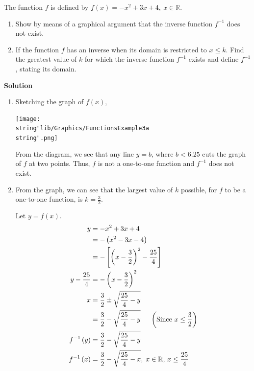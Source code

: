\documentclass[11pt,a4paper]{book}
\newcommand{\R}{\mathbb{R}}
\begin{document}
\begin{example}{}

The function $f$ is defined by $f\left(x\right)=-x^{2}+3x+4,\:x\in\R$.

\begin{enumerate}[label=(\alph*)]

\item  Show by means of a graphical argument that the inverse function
$f^{-1}$ does not exist.

\item  If the function $f$ has an inverse when its domain is restricted
to $x\leq k$. Find the greatest value of $k$ for which the inverse
function $f^{-1}$ exists and define $f^{-1}$, stating its domain.

\end{enumerate}

\textbf{Solution}

\begin{enumerate}[label=(\alph*)]

\item Sketching the graph of $f\left(x\right)$,
\begin{center}
\texttt{[image: \\string"lib/Graphics/FunctionsExample3a\\string".png]}
\par\end{center}

From the diagram, we see that any line $y=b$, where $b<6.25$ cuts
the graph of $f$ at two points. Thus, $f$ is not a one-to-one function
and $f^{-1}$ does not exist.

\item From the graph, we can see that the largest value of $k$ possible,
for $f$ to be a one-to-one function, is ${\displaystyle k=\frac{3}{2}}$.

Let $y=f\left(x\right)$.
\begin{align*}
y & =-x^{2}+3x+4\\
 & =-\left(x^{2}-3x-4\right)\\
 & =-\left[\left(x-\frac{3}{2}\right)^{2}-\frac{25}{4}\right]\\
y-\frac{25}{4} & =-\left(x-\frac{3}{2}\right)^{2}\\
x & =\frac{3}{2}\pm\sqrt{\frac{25}{4}-y} \\
 & =\frac{3}{2}-\sqrt{\frac{25}{4}-y}\hspace{.5cm}\left( \text{Since ${\displaystyle x\leq\frac{3}{2}}$}\right)\\
f^{-1}\left(y\right) & =\frac{3}{2}-\sqrt{\frac{25}{4}-y}\\
f^{-1}\left(x\right) & =\frac{3}{2}-\sqrt{\frac{25}{4}-x},\;x\in\R,\,x\leq\frac{25}{4}
\end{align*}

\end{enumerate}

\end{example}
\end{document}
